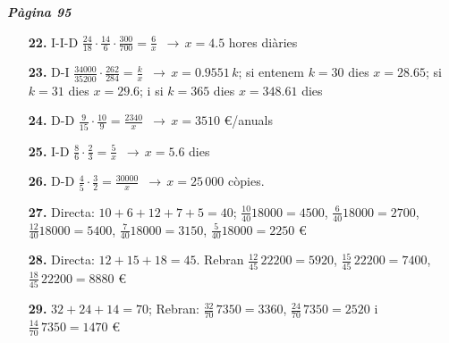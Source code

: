 \documentclass[a4paper, pdf, twoside]{book}
\begin{document}
\begin{multicols}{2}

{\textbf{\em Pàgina 95}} \hrulefill
\begin{enumerate}
\vspace{0.25cm}
\item[\fontfamily{phv}\selectfont\color{blue}\textbf{22. }] 
I-I-D $\frac {24}{18} \cdot \frac {14}{6} \cdot \frac {300}{700}= \frac {6}{x}$ $\, \rightarrow \, x=4.5$ hores diàries
 \end{enumerate}
\begin{enumerate}
\vspace{0.25cm}
\item[\fontfamily{phv}\selectfont\color{blue}\textbf{23. }] 
D-I $\frac {34000}{35200} \cdot \frac {262}{284} = \frac {k}{x}$ $\, \rightarrow \, x=0.9551\, k$; si entenem $k=30$ dies $x=28.65$; si $k=31$ dies $x=29.6$; i si $k=365$ dies $x=348.61$ dies
\vspace{0.25cm}
\item[\fontfamily{phv}\selectfont\color{blue}\textbf{24. }] 
D-D $\frac {9}{15} \cdot \frac {10}{9} = \frac {2340}{x}$ $\, \rightarrow \, x=3510$ \euro {}/anuals
\vspace{0.25cm}
\item[\fontfamily{phv}\selectfont\color{blue}\textbf{25. }] 
I-D $\frac {8}{6} \cdot \frac {2}{3} = \frac {5}{x}$ $\, \rightarrow \, x=5.6$ dies
\vspace{0.25cm}
\item[\fontfamily{phv}\selectfont\color{blue}\textbf{26. }] 
D-D $\frac {4}{5} \cdot \frac {3}{2} = \frac {30000}{x}$ $\, \rightarrow \, x=25\,000$ còpies.
\vspace{0.25cm}
\item[\fontfamily{phv}\selectfont\color{blue}\textbf{27. }] 
Directa: $10 + 6+ 12+ 7 + 5=40$; $\frac {10}{40} 18000=4500$, $\frac {6}{40} 18000=2700$, $\frac {12}{40} 18000=5400$, $\frac {7}{40} 18000=3150$, $\frac {5}{40} 18000=2250$ \euro {}
\vspace{0.25cm}
\item[\fontfamily{phv}\selectfont\color{blue}\textbf{28. }] 
Directa: $12+15+18=45$. Rebran $\frac {12}{45}\,22200=5920$, $\frac {15}{45}\,22200=7400$, $\frac {18}{45}\,22200=8880$ \euro {}
\vspace{0.25cm}
\item[\fontfamily{phv}\selectfont\color{blue}\textbf{29. }] 
$32+24+14=70$; Rebran: $\frac {32}{70}\, 7350=3360$, $\frac {24}{70}\, 7350=2520$ i $\frac {14}{70}\, 7350=1470$ \euro {} 
 \end{enumerate}
\vspace{0.3cm}


\end{multicols}
\end{document}
